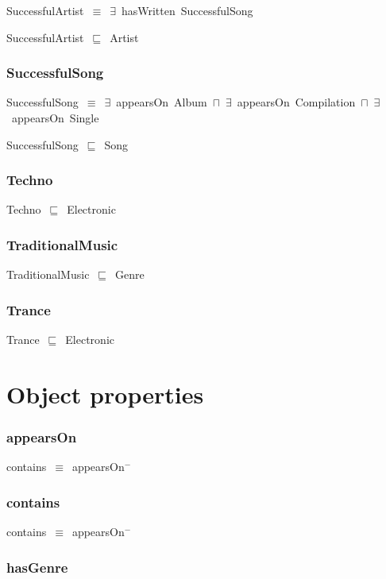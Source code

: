 \documentclass{article}
\begin{document}
SuccessfulArtist~\ensuremath{\equiv}~\ensuremath{\exists}~hasWritten~SuccessfulSong

SuccessfulArtist~\ensuremath{\sqsubseteq}~Artist~

\subsubsection*{SuccessfulSong}

SuccessfulSong~\ensuremath{\equiv}~\ensuremath{\exists}~appearsOn~Album~\ensuremath{\sqcap}~\ensuremath{\exists}~appearsOn~Compilation~\ensuremath{\sqcap}~\ensuremath{\exists}~appearsOn~Single

SuccessfulSong~\ensuremath{\sqsubseteq}~Song~

\subsubsection*{Techno}

Techno~\ensuremath{\sqsubseteq}~Electronic~

\subsubsection*{TraditionalMusic}

TraditionalMusic~\ensuremath{\sqsubseteq}~Genre~

\subsubsection*{Trance}

Trance~\ensuremath{\sqsubseteq}~Electronic~

\section*{Object properties}\subsubsection*{appearsOn}

contains~\ensuremath{\equiv}~appearsOn\ensuremath{^-}

\subsubsection*{contains}

contains~\ensuremath{\equiv}~appearsOn\ensuremath{^-}

\subsubsection*{hasGenre}
\end{document}
